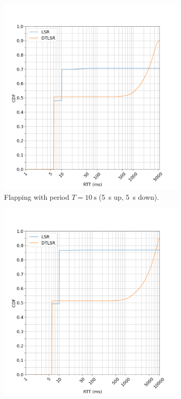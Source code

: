 \documentclass[10pt,twoside,a4paper]{article}
\begin{document}
\pagebreak

\begin{figure}
\begin{subfigure}{15cm}
  \centering
  \includegraphics[width=1\linewidth]{delay_box_flap5}
  \caption{Flapping with period $T=\SI{10}{\s}$ (\SI{5}{\s} up, \SI{5}{\s} down).}
  \label{fig:box_5}
\end{subfigure}
\begin{subfigure}{15cm}
  \centering
  \includegraphics[width=1\linewidth]{delay_box_flap10}

\end{subfigure}
\end{figure}
\end{document}
